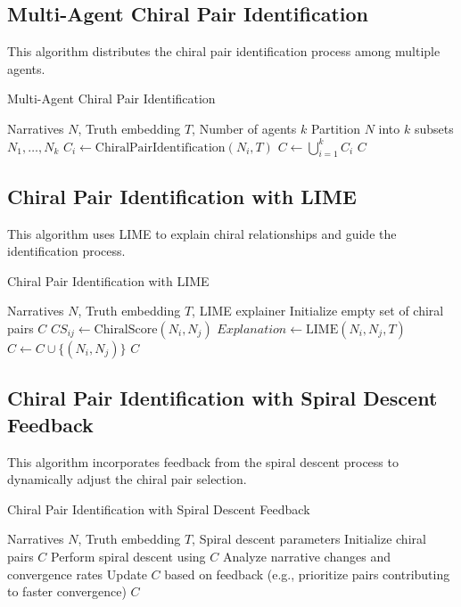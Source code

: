 \documentclass[12pt, a4paper]{article}
\begin{document}
\subsection{Multi-Agent Chiral Pair Identification}

This algorithm distributes the chiral pair identification process among multiple agents.

\begin{algorithm}[H]
\caption{Multi-Agent Chiral Pair Identification}
\begin{algorithmic}[1]
\Require Narratives $N$, Truth embedding $T$, Number of agents $k$
\State Partition $N$ into $k$ subsets $N_1, \dots, N_k$
    \State $C_i \gets \text{ChiralPairIdentification}(N_i, T)$ 
\EndFor
\State $C \gets \bigcup_{i=1}^k C_i$
\State {}
\Return $C$
\end{algorithmic}
\end{algorithm}


\subsection{Chiral Pair Identification with LIME}

This algorithm uses LIME to explain chiral relationships and guide the identification process.

\begin{algorithm}[H]
\caption{Chiral Pair Identification with LIME}
\begin{algorithmic}[1]
\Require Narratives $N$, Truth embedding $T$, LIME explainer
\State Initialize empty set of chiral pairs $C$
    \State $CS_{ij} \gets \text{ChiralScore}(N_i, N_j)$
        \State $Explanation \gets \text{LIME}(N_i, N_j, T)$
            \State $C \gets C \cup \{(N_i, N_j)\}$
        \EndIf
    \EndIf
\EndFor
\Return $C$
\end{algorithmic}
\end{algorithm}


\subsection{Chiral Pair Identification with Spiral Descent Feedback}

This algorithm incorporates feedback from the spiral descent process to dynamically adjust the chiral pair selection.

\begin{algorithm}[H]
\caption{Chiral Pair Identification with Spiral Descent Feedback}
\begin{algorithmic}[1]
\Require Narratives $N$, Truth embedding $T$, Spiral descent parameters
\State Initialize chiral pairs $C$
\Repeat
    \State Perform spiral descent using $C$
    \State Analyze narrative changes and convergence rates
    \State Update $C$ based on feedback (e.g., prioritize pairs contributing to faster convergence)
\Return $C$
\end{algorithmic}
\end{algorithm}
\end{document}
